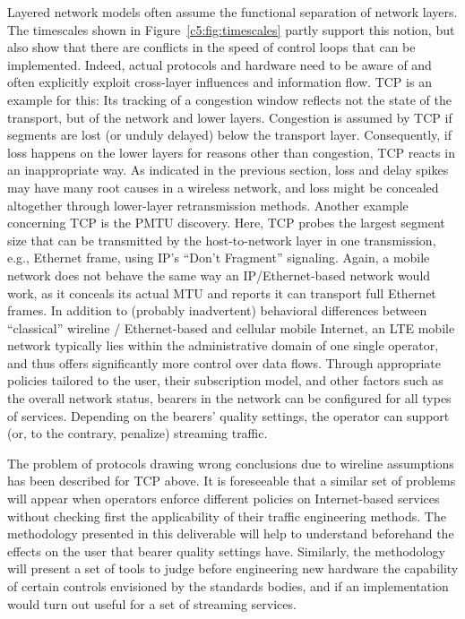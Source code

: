 Layered network models often assume the functional separation of network layers. The timescales shown in Figure~\ref{c5:fig:timescales} partly support this notion, but also show that there are conflicts in the speed of control loops that can be implemented. Indeed, actual protocols and hardware need to be aware of and often explicitly exploit cross-layer influences and information flow.
\gls{TCP} is an example for this: Its tracking of a congestion window reflects not the state of the transport, but of the network and lower layers. Congestion is assumed by \gls{TCP} if segments are lost (or unduly delayed) below the transport layer. Consequently, if loss happens on the lower layers for reasons other than congestion, \gls{TCP} reacts in an inappropriate way. As indicated in the previous section, loss and delay spikes may have many root causes in a wireless network, and loss might be concealed altogether through lower-layer retransmission methods.
Another example concerning \gls{TCP} is the \gls{PMTU} discovery. Here, \gls{TCP} probes the largest segment size that can be transmitted by the host-to-network layer in one transmission, e.g., Ethernet frame, using \gls{IP}'s ``Don't Fragment'' signaling. Again, a mobile network does not behave the same way an \gls{IP}/Ethernet-based network would work, as it conceals its actual \gls{MTU} and reports it can transport full Ethernet frames.
In addition to (probably inadvertent) behavioral differences between ``classical'' wireline / Ethernet-based and cellular mobile Internet, an \gls{LTE} mobile network typically lies within the administrative domain of one single operator, and thus offers significantly more control over data flows. Through appropriate policies tailored to the user, their subscription model, and other factors such as the overall network status, bearers in the network can be configured for all types of services. Depending on the bearers' quality settings, the operator can support (or, to the contrary, penalize) streaming traffic.

The problem of protocols drawing wrong conclusions due to wireline assumptions has been described for \gls{TCP} above. It is foreseeable that a similar set of problems will appear when operators enforce different policies on Internet-based services without checking first the applicability of their traffic engineering methods. The methodology presented in this deliverable will help to understand beforehand the effects on the user that bearer quality settings have. Similarly, the methodology will present a set of tools to judge before engineering new hardware the capability of certain controls envisioned by the standards bodies, and if an implementation would turn out useful for a set of streaming services.










